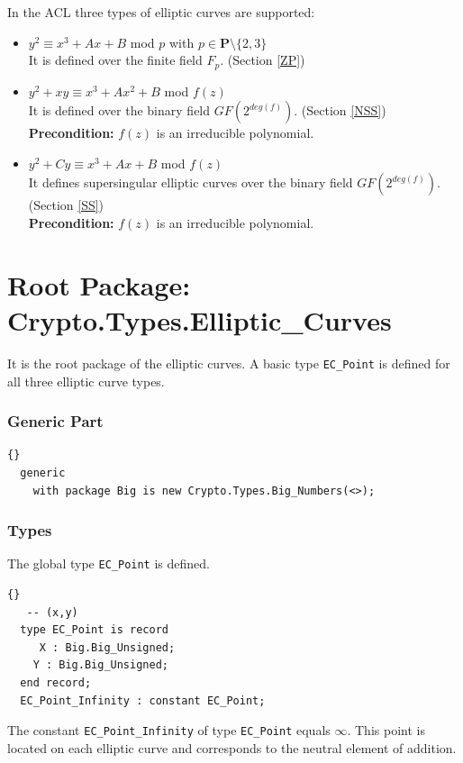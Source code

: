 \hhline

In the ACL three types of elliptic curves are supported:
\begin{itemize}
\item $y^2 \equiv x^3 + Ax + B$ mod $p$ with $p \in \textbf{P} \setminus \{2,3\}$\\
      It is defined over the finite field $F_p$. (Section \ref{ZP})
\item $y^2 + xy \equiv x^3 + Ax^2 + B$ mod $f(z)$\\
      It is defined over the binary field $GF(2^{deg(f)})$. (Section \ref{NSS})\\
      \textbf{Precondition:} $f(z)$ is an irreducible polynomial.
\item $y^2 + Cy \equiv x^3 + Ax + B$ mod $f(z)$\\
      It defines supersingular elliptic curves over the binary field $GF(2^{deg(f)})$. (Section \ref{SS})\\
      \textbf{Precondition:} $f(z)$ is an irreducible polynomial.
\end{itemize}


\section{Root Package: Crypto.Types.Elliptic\_Curves}\label{EllipticRoot}
It is the root package of the elliptic curves. A basic type \texttt{EC\_Point} is defined for all three elliptic curve types.
\subsubsection*{Generic Part}
\begin{lstlisting}{}
  generic
  	with package Big is new Crypto.Types.Big_Numbers(<>);
\end{lstlisting}
\subsubsection*{Types}
The global type \texttt{EC\_Point} is defined.
\begin{lstlisting}{}
   -- (x,y)
  type EC_Point is record
  	 X : Big.Big_Unsigned;
    Y : Big.Big_Unsigned;
  end record;
  EC_Point_Infinity : constant EC_Point;
\end{lstlisting}
The constant \texttt{EC\_Point\_Infinity} of type \texttt{EC\_Point}
equals $\infty$. This point is located on each elliptic curve and
corresponds to the neutral element of addition.

